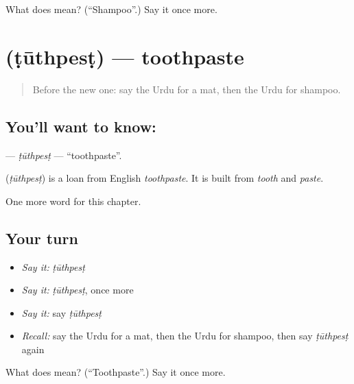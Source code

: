 \begin{tcolorbox}[breakable,colback=teal!4,colframe=teal!35!black,title={Before you move on}]
What does  mean? (\textquotedblleft{}Shampoo\textquotedblright{}.) Say it once more.
\end{tcolorbox}
\section[\texorpdfstring{\ur{ٹوتھ} \ur{پیسٹ} (ṭūthpesṭ)}{ٹوتھ پیسٹ (ṭūthpesṭ)}]{  (ṭūthpesṭ) — toothpaste}

\label{lesson:UR-C197-tuthpest}



\begin{quote}
Before the new one: say the Urdu for a mat, then the Urdu for shampoo.
\end{quote}

\subsection*{You'll want to know:  }
\textbf{ } — \emph{ṭūthpesṭ} — \textquotedblleft{}toothpaste\textquotedblright{}.

\begin{cousinweb}
\textbf{ } (\emph{ṭūthpesṭ}) is a loan from English \emph{toothpaste}. It is built from \emph{tooth} and \emph{paste}.
\end{cousinweb}

\begin{grammarlens}[title={What you've built}]
One more word for this chapter.
\end{grammarlens}

\subsection*{Your turn}
\begin{itemize}
\raggedright
  \item \emph{Say it:} \emph{ṭūthpesṭ}
  \item \emph{Say it:} \emph{ṭūthpesṭ}, once more
  \item \emph{Say it:} say \emph{ṭūthpesṭ}
  \item \emph{Recall:} say the Urdu for a mat, then the Urdu for shampoo, then say \emph{ṭūthpesṭ} again
\end{itemize}

\begin{tcolorbox}[breakable,colback=teal!4,colframe=teal!35!black,title={Before you move on}]
What does   mean? (\textquotedblleft{}Toothpaste\textquotedblright{}.) Say it once more.
\end{tcolorbox}
